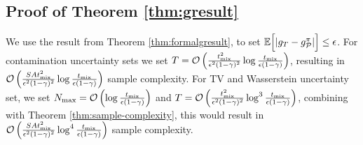 \subsection{Proof of Theorem \ref{thm:gresult}}
We use the result from Theorem \ref{thm:formalgresult}, to set $\mathbb{E}\Bigl[\left | g_{T}-g^\pi_{\mathcal{P}} \right |\Bigr]  \leq \epsilon$. For contamination uncertainty sets we set 
 $T=\operatorname*{\mathcal{O}}\left(\frac{t^2_{\mathrm{mix}}}{\epsilon^2(1-\gamma)^2} \log \frac{t_\mathrm{mix}}{\epsilon(1-\gamma)}\right)$, resulting in $\operatorname*{\mathcal{O}}\left(\frac{SAt^2_{\mathrm{mix}}}{\epsilon^2(1-\gamma)^2} \log \frac{t_\mathrm{mix}}{\epsilon(1-\gamma)}\right)$ sample complexity. For TV and Wasserstein uncertainty set, we set 
$N_{\max}=\operatorname*{\mathcal{O}}\left(\log \frac{t_{\mathrm{mix}}}{\epsilon(1-\gamma)}\right)$ and $T=\operatorname*{\mathcal{O}}\left(\frac{t^2_{\mathrm{mix}}}{\epsilon^2(1-\gamma)^2} \log^3\frac{t_{\mathrm{mix}}}{\epsilon(1-\gamma)}\right)$, combining with Theorem \ref{thm:sample-complexity}, this would result in $\operatorname*{\mathcal{O}}\left(\frac{SAt^2_{\mathrm{mix}}}{\epsilon^2(1-\gamma)^2} \log^4\frac{t_{\mathrm{mix}}}{\epsilon(1-\gamma)}\right)$ sample complexity.







